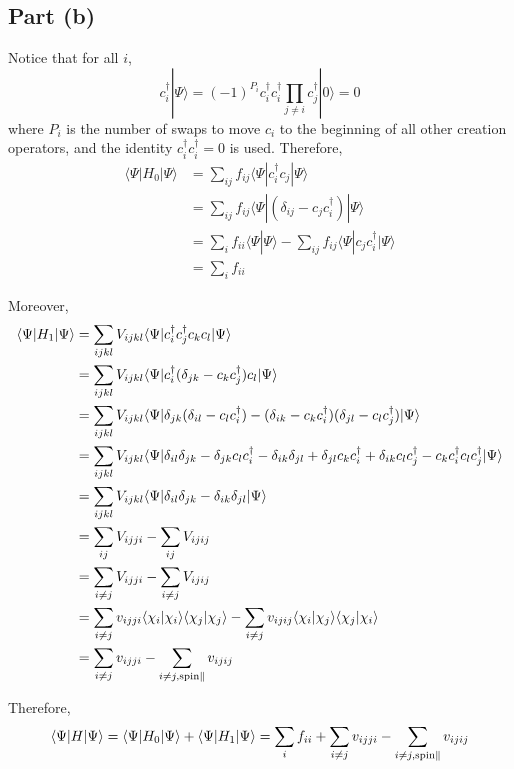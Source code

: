 \documentclass{article}
\begin{document}
\subsection{Part (b)}
Notice that for all $i$,
\begin{equation*}
c_i^\dag|\Psi\rangle=(-1)^{P_i}c_i^\dag c_i^\dag\prod_{j\neq i}c_j^\dag|0\rangle=0
\end{equation*}
where $P_i$ is the number of swaps to move $c_i$ to the beginning of all other creation operators, and the identity $c_i^\dag c_i^\dag=0$ is used. Therefore,
\begin{align*}
\langle\Psi|H_0|\Psi\rangle&=\sum_{ij}f_{ij}\langle\Psi|c_i^\dag c_j|\Psi\rangle\\
&=\sum_{ij}f_{ij}\langle\Psi|(\delta_{ij}-c_jc_i^\dag)|\Psi\rangle\\
&=\sum_if_{ii}\langle\Psi|\Psi\rangle-\sum_{ij}f_{ij}\langle\Psi|c_jc_i^\dag|\Psi\rangle\\
&=\sum_if_{ii}
\end{align*}

Moreover,
\begin{align*}
\langle\Psi|H_1|\Psi\rangle&=\sum_{ijkl}V_{ijkl}\langle\Psi|c_i^\dag c_j^\dag c_kc_l|\Psi\rangle\\
&=\sum_{ijkl}V_{ijkl}\langle\Psi|c_i^\dag(\delta_{jk}-c_kc_j^\dag)c_l|\Psi\rangle\\
&=\sum_{ijkl}V_{ijkl}\langle\Psi|\delta_{jk}(\delta_{il}-c_lc_i^\dag)-(\delta_{ik}-c_kc_i^\dag)(\delta_{jl}-c_lc_j^\dag)|\Psi\rangle\\
&=\sum_{ijkl}V_{ijkl}\langle\Psi|\delta_{il}\delta_{jk}-\delta_{jk}c_lc_i^\dag-\delta_{ik}\delta_{jl}+\delta_{jl}c_kc_i^\dag+\delta_{ik}c_lc_j^\dag-c_kc_i^\dag c_lc_j^\dag|\Psi\rangle\\
&=\sum_{ijkl}V_{ijkl}\langle\Psi|\delta_{il}\delta_{jk}-\delta_{ik}\delta_{jl}|\Psi\rangle\\
&=\sum_{ij}V_{ijji}-\sum_{ij}V_{ijij}\\
&=\sum_{i\neq j}V_{ijji}-\sum_{i\neq j}V_{ijij}\\
&=\sum_{i\neq j}v_{ijji}\langle\chi_i|\chi_i\rangle\langle\chi_j|\chi_j\rangle-\sum_{i\neq j}v_{ijij}\langle\chi_i|\chi_j\rangle\langle\chi_j|\chi_i\rangle\\
&=\sum_{i\neq j}v_{ijji}-\sum_{i\neq j,\textup{spin}\parallel}v_{ijij}
\end{align*}

Therefore,
\begin{equation*}
\langle\Psi|H|\Psi\rangle=\langle\Psi|H_0|\Psi\rangle+\langle\Psi|H_1|\Psi\rangle=\sum_if_{ii}+\sum_{i\neq j}v_{ijji}-\sum_{i\neq j,\textup{spin}\parallel}v_{ijij}
\end{equation*}
\end{document}
